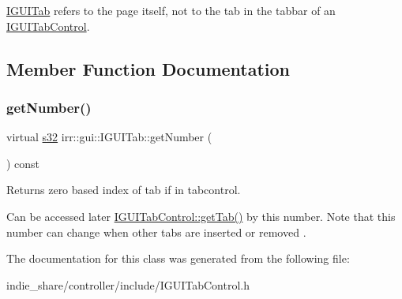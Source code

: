 \hyperlink{classirr_1_1gui_1_1IGUITab}{I\+G\+U\+I\+Tab} refers to the page itself, not to the tab in the tabbar of an \hyperlink{classirr_1_1gui_1_1IGUITabControl}{I\+G\+U\+I\+Tab\+Control}. 

\subsection{Member Function Documentation}
\mbox{\label{classirr_1_1gui_1_1IGUITab_aedc76f9d93782188741ace78b32634f0}} 
\subsubsection{\texorpdfstring{get\+Number()}{getNumber()}}
{\footnotesize\ttfamily virtual \hyperlink{namespaceirr_ac66849b7a6ed16e30ebede579f9b47c6}{s32} irr\+::gui\+::\+I\+G\+U\+I\+Tab\+::get\+Number (\begin{DoxyParamCaption}{ }\end{DoxyParamCaption}) const\hspace{0.3cm}{\ttfamily [pure virtual]}}



Returns zero based index of tab if in tabcontrol. 

Can be accessed later \hyperlink{classirr_1_1gui_1_1IGUITabControl_a1ce91106037c880aae15df77f42aeeda}{I\+G\+U\+I\+Tab\+Control\+::get\+Tab()} by this number. Note that this number can change when other tabs are inserted or removed . 

The documentation for this class was generated from the following file\+:\begin{DoxyCompactItemize}
\item 
indie\+\_\+share/controller/include/I\+G\+U\+I\+Tab\+Control.\+h\end{DoxyCompactItemize}
